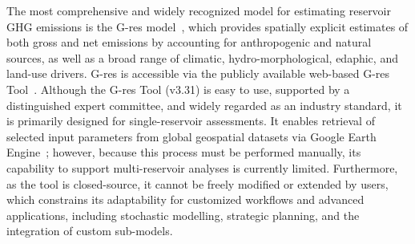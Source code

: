\documentclass[review, authoryear, 1p]{elsarticle} %
\begin{document}

The most comprehensive and widely recognized model for estimating reservoir \ac{GHG} emissions is the G-res model~\citep{Prairie2017b, Prairie2021}, which provides spatially explicit estimates of both gross and net emissions by accounting for anthropogenic and natural sources, as well as a broad range of climatic, hydro-morphological, edaphic, and land-use drivers.
G-res is accessible via the publicly available web-based G-res Tool~\citep{prairie2017gres}. %
Although the G-res Tool (v3.31) is easy to use, supported by a distinguished expert committee, and widely regarded as an industry standard, it is primarily designed for single-reservoir assessments.
It enables retrieval of selected input parameters from global geospatial datasets via Google Earth Engine~\citep{Gorelick2017}; however, because this process must be performed manually, its capability to support multi-reservoir analyses is currently limited.
Furthermore, as the tool is closed-source, it cannot be freely modified or extended by users, which constrains its adaptability for customized workflows and advanced applications, including stochastic modelling, strategic planning, and the integration of custom sub-models.

\end{document}

